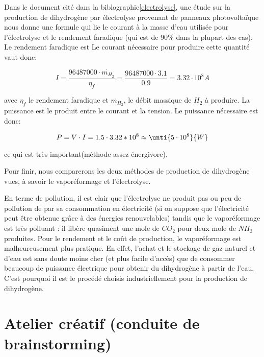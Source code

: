 Dans le document cité dans la biblographie\ref{electrolyse}, une étude sur la production
de dihydrogène par électrolyse provenant de panneaux photovoltaïque nous
donne une formule qui lie le courant à la masse d'eau utilisée pour
l'électrolyse et le rendement faradique (qui est de 90\% dans la plupart des cas).
Le rendement faradique est Le courant nécessaire pour produire cette quantité vaut donc:

$$I = \frac{96487000\cdot {\dot{m_{H_{2}}}}}{\eta_{f}} = \frac{96487000\cdot 3.1}{0.9} =  \unit{3.32\cdot 10^{8}}{A}$$

avec $\eta_{f}$ le rendement faradique et $\dot{m_{H_{2}}}$, le débit massique
de $H_{2}$ à produire. La puissance est le produit entre le courant et la 
tension. Le puissance nécessaire est donc:

$$P = V\cdot I = 1.5\cdot 3.32*10^{8} \approx \unti{5\cdot 10^{8}}{W}$$

ce qui est très important(méthode assez énergivore).

Pour finir, nous comparerons les deux méthodes de production de 
dihydrogène vues, à savoir le vaporéformage et l'électrolyse.

En terme de pollution, il est clair que l'électrolyse ne produit 
pas ou peu de pollution de par sa consommation en électricité 
(si on suppose que l'électricité peut être obtenue grâce à des énergies renouvelables)
tandis que le vaporéformage est très polluant : il libère quasiment une mole de $CO_{2}$
pour deux mole de $NH_{3}$ produites. Pour le rendement et le coût de production, 
le vaporéformage est malheureusement plus pratique. En effet, l'achat et le stockage
de gaz naturel et d'eau est sans doute moins cher (et plus facile d'accès) que 
de consommer beaucoup de puissance électrique pour obtenir du dihydrogène à partir
de l'eau. C'est pourquoi il est le procédé choisis industriellement pour la production
de dihydrogène.

\section{Atelier créatif (conduite de brainstorming)}



